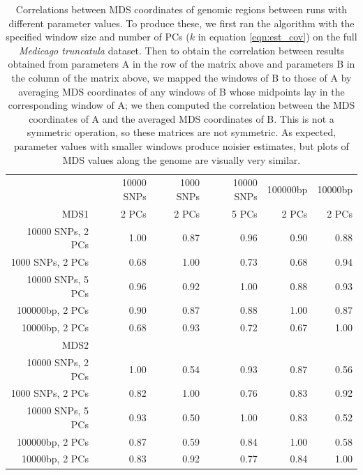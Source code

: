 \documentclass[11pt, oneside]{article}   	%
\begin{document}
\begin{table}[ht]
\centering
    \begin{tabular}{rrrrrr}
      \hline
          & 10000 SNPs & 1000 SNPs & 10000 SNPs & 100000bp & 10000bp \\ 
     MDS1 & 2 PCs & 2 PCs & 5 PCs & 2 PCs & 2 PCs \\ 
      \hline
  10000 SNPs, 2 PCs & 1.00 & 0.87 & 0.96 & 0.90 & 0.88 \\ 
  1000 SNPs, 2 PCs & 0.68 & 1.00 & 0.73 & 0.68 & 0.94 \\ 
  10000 SNPs, 5 PCs & 0.96 & 0.92 & 1.00 & 0.88 & 0.93 \\ 
  100000bp, 2 PCs & 0.90 & 0.87 & 0.88 & 1.00 & 0.87 \\ 
  10000bp, 2 PCs & 0.68 & 0.93 & 0.72 & 0.67 & 1.00 \\ 
       \hline
       \hline
        MDS2 & &&&&\\
      \hline
      10000 SNPs, 2 PCs & 1.00 & 0.54 & 0.93 & 0.87 & 0.56 \\ 
      1000 SNPs, 2 PCs & 0.82 & 1.00 & 0.76 & 0.83 & 0.92 \\ 
      10000 SNPs, 5 PCs & 0.93 & 0.50 & 1.00 & 0.83 & 0.52 \\ 
      100000bp, 2 PCs & 0.87 & 0.59 & 0.84 & 1.00 & 0.58 \\ 
      10000bp, 2 PCs & 0.83 & 0.92 & 0.77 & 0.84 & 1.00 \\ 
       \hline
    \end{tabular}
    \caption{
        Correlations between MDS coordinates of genomic regions
        between runs with different parameter values.
        To produce these, 
        we first ran the algorithm with the specified window size and number of PCs 
        ($k$ in equation \eqref{eqn:est_cov})
        on the full \textit{Medicago truncatula} dataset.
        Then to obtain the correlation between results obtained from parameters A in the row of the matrix above
        and parameters B in the column of the matrix above,
        we mapped the windows of B to those of A by averaging MDS coordinates of any windows of B whose midpoints lay in the corresponding window of A;
        we then computed the correlation between the MDS coordinates of A and the averaged MDS coordinates of B.
        This is not a symmetric operation, so these matrices are not symmetric.
        As expected, parameter values with smaller windows produce noisier estimates,
        but plots of MDS values along the genome are visually very similar.
    } \label{tab:param_cors}
\end{table}
\end{document}

